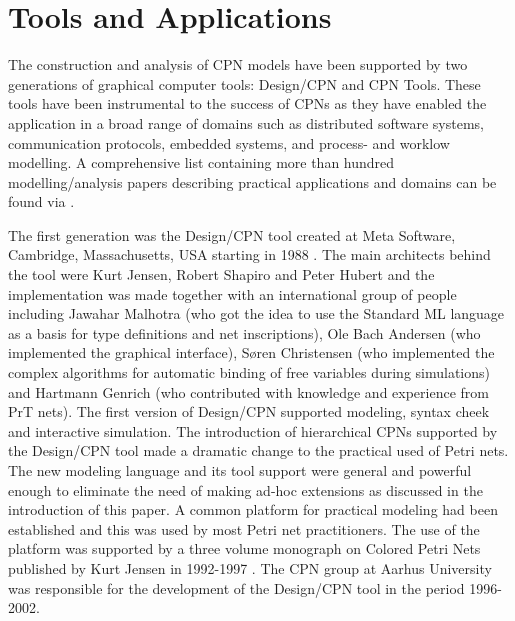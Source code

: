 \section{Tools and Applications}

The construction and analysis of CPN models have been supported by two
generations of graphical computer tools: Design/CPN and CPN
Tools. These tools have been instrumental to the success of CPNs as
they have enabled the application in a broad range of domains such as
distributed software systems, communication protocols, embedded
systems, and process- and worklow modelling. A comprehensive list
containing more than hundred modelling/analysis papers describing
practical applications and domains can be found via \cite{cpnuse}.

The first generation was the Design/CPN tool \cite{jensen:cpnmanual}
created at Meta Software, Cambridge, Massachusetts, USA starting in
1988 \cite{jensen:cpnmanual}. The main architects behind the tool were
Kurt Jensen, Robert Shapiro and Peter Hubert and the implementation
was made together with an international group of people including
Jawahar Malhotra (who got the idea to use the Standard ML language as
a basis for type definitions and net inscriptions), Ole Bach Andersen
(who implemented the graphical interface), S\o{}ren Christensen (who
implemented the complex algorithms for automatic binding of free
variables during simulations) and Hartmann Genrich (who contributed
with knowledge and experience from PrT nets). The first version of
Design/CPN supported modeling, syntax cheek and interactive
simulation. The introduction of hierarchical CPNs supported by the
Design/CPN tool made a dramatic change to the practical used of Petri
nets. The new modeling language and its tool support were general and
powerful enough to eliminate the need of making ad-hoc extensions as
discussed in the introduction of this paper. A common platform for
practical modeling had been established and this was used by most
Petri net practitioners. The use of the platform was supported by a
three volume monograph on Colored Petri Nets published by Kurt Jensen
in 1992-1997 \cite{jensen:cpnvols}. The CPN group at Aarhus University
was responsible for the development of the Design/CPN tool in the
period 1996-2002.

